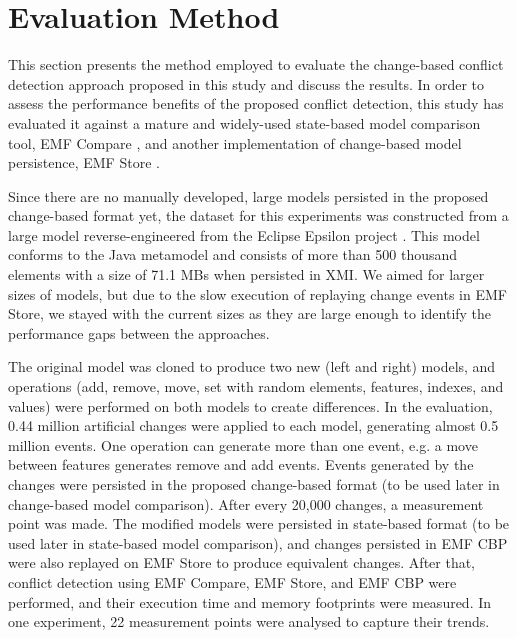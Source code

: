 \section{Evaluation Method}
\label{sec:evaluation_method}
This section presents the method employed to evaluate the change-based conflict detection approach proposed in this study and discuss the results. In order to assess the performance benefits of the proposed conflict detection, this study has evaluated it against a mature and widely-used state-based model comparison tool, EMF Compare \cite{emfcompare2018developer,eclipse2017compare}, and another implementation of change-based model persistence, EMF Store \cite{koegel2010emfstore}.

Since there are no manually developed, large models persisted in the proposed change-based format yet, the dataset for this experiments was constructed from a large model reverse-engineered from the Eclipse Epsilon project \cite{eclipse2018epsilongit,eclipse2017epsilon}. This model conforms to the Java metamodel \cite{eclipse2018modiscojava} and consists of more than 500 thousand elements with a size of 71.1 MBs when persisted in XMI. We aimed for larger sizes of models, but due to the slow execution of replaying change events in EMF Store, we stayed with the current sizes as they are large enough to identify the performance gaps between the approaches.

The original model was cloned to produce two new (left and right) models, and operations (\textsf{add}, \textsf{remove}, \textsf{move}, \textsf{set} with random elements, features, indexes, and values) were performed on both models to create differences. In the evaluation, 0.44 million artificial changes were applied to each model, generating almost 0.5 million events. One operation can generate more than one event, e.g. a \textsf{move} between features generates \textsf{remove} and \textsf{add} events. Events generated by the changes were persisted in the proposed change-based format (to be used later in change-based model comparison). After every 20,000 changes, a measurement point was made. The modified models were persisted in state-based format (to be used later in state-based model comparison), and changes persisted in EMF CBP were also replayed on EMF Store to produce equivalent changes. After that, conflict detection using EMF Compare, EMF Store, and EMF CBP were performed, and their execution time and memory footprints were measured. In one experiment, 22 measurement points were analysed to capture their trends.

